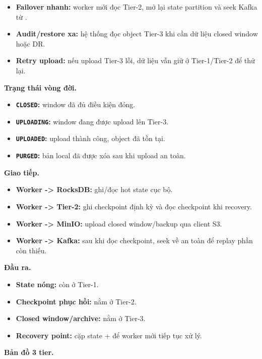 \documentclass[12pt,a4paper]{article}
\begin{document}
\begin{itemize}
\item \textbf{Failover nhanh:} worker mới đọc Tier-2, mở lại state partition và seek Kafka từ .
\item \textbf{Audit/restore xa:} hệ thống đọc object Tier-3 khi cần dữ liệu closed window hoặc DR.
\item \textbf{Retry upload:} nếu upload Tier-3 lỗi, dữ liệu vẫn giữ ở Tier-1/Tier-2 để thử lại.
\end{itemize}
\textbf{Trạng thái vòng đời.}

\begin{itemize}
\item \textbf{\texttt{CLOSED}:} window đã đủ điều kiện đóng.
\item \textbf{\texttt{UPLOADING}:} window đang được upload lên Tier-3.
\item \textbf{\texttt{UPLOADED}:} upload thành công, object đã tồn tại.
\item \textbf{\texttt{PURGED}:} bản local đã được xóa sau khi upload an toàn.
\end{itemize}
\textbf{Giao tiếp.}

\begin{itemize}
\item \textbf{Worker -> RocksDB:} ghi/đọc hot state cục bộ.
\item \textbf{Worker -> Tier-2:} ghi checkpoint định kỳ và đọc checkpoint khi recovery.
\item \textbf{Worker -> MinIO:} upload closed window/backup qua client S3.
\item \textbf{Worker -> Kafka:} sau khi đọc checkpoint, seek về  an toàn để replay phần còn thiếu.
\end{itemize}
\textbf{Đầu ra.}

\begin{itemize}
\item \textbf{State nóng:} còn ở Tier-1.
\item \textbf{Checkpoint phục hồi:} nằm ở Tier-2.
\item \textbf{Closed window/archive:} nằm ở Tier-3.
\item \textbf{Recovery point:} cặp state +  để worker mới tiếp tục xử lý.
\end{itemize}
\textbf{Bản đồ 3 tier.}
\end{document}
